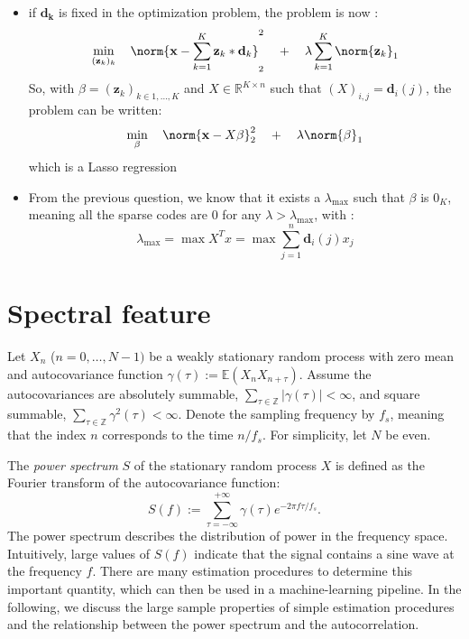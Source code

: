 \documentclass[11pt]{article}
\begin{document}
\begin{solution}  %
\begin{itemize}
    \item if $\mathbf{d_k}$ is fixed in the optimization problem, the problem is now :
    \begin{equation}
        \min_{(\mathbf{z}_k)_k} \quad\norm{\mathbf{x} - \sum_{k=1}^K \mathbf{z}_k * \mathbf{d}_k }^2_2 \quad + \quad\lambda \sum_{k=1}^K \norm{\mathbf{z}_k}_1
    \end{equation}
    So, with $\beta = (\mathbf{z}_k)_{k\in{1,\dots,K}}$ and $X\in\mathbb{R}^{K\times n}$ such that $(X)_{i,j}=\mathbf{d}_i(j)$, the problem  can be written:
    \begin{equation}
        \min_{\beta} \quad\norm{\mathbf{x} - X\beta}^2_2 \quad + \quad\lambda \norm{\beta}_1
    \end{equation}
    which is a Lasso regression
    \item From the previous question, we know that it exists a $\lambda_{\max}$ such that $\beta$ is $0_K$, meaning all the sparse codes are 0 for any $\lambda>\lambda_{\max}$, with :
    \begin{equation}
         \lambda_{\max} = \max X^Tx = \max \sum_{j=1}^{n}\mathbf{d}_i(j)x_j
    \end{equation}
\end{itemize}

\end{solution}

\section{Spectral feature}

Let $X_n$ ($n=0,\dots, N-1)$ be a weakly stationary random process with zero mean and autocovariance function $\gamma(\tau):= \mathbb{E}(X_n X_{n+\tau})$.
Assume the autocovariances are absolutely summable, \ie $\sum_{\tau\in\mathbb{Z}} |\gamma(\tau)| < \infty$, and square summable, \ie $\sum_{\tau\in\mathbb{Z}} \gamma^2(\tau) < \infty$.
Denote the sampling frequency by $f_s$, meaning that the index $n$ corresponds to the time $n / f_s$. For simplicity, let $N$ be even.


The \textit{power spectrum} $S$ of the stationary random process $X$ is defined as the Fourier transform of the autocovariance function:
\begin{equation}
    S(f) := \sum_{\tau=-\infty}^{+\infty}\gamma(\tau)e^{-2\pi f\tau/f_s}.
\end{equation}
The power spectrum describes the distribution of power in the frequency space. 
Intuitively, large values of $S(f)$ indicate that the signal contains a sine wave at the frequency $f$.
There are many estimation procedures to determine this important quantity, which can then be used in a machine-learning pipeline.
In the following, we discuss the large sample properties of simple estimation procedures and the relationship between the power spectrum and the autocorrelation.
\end{document}
